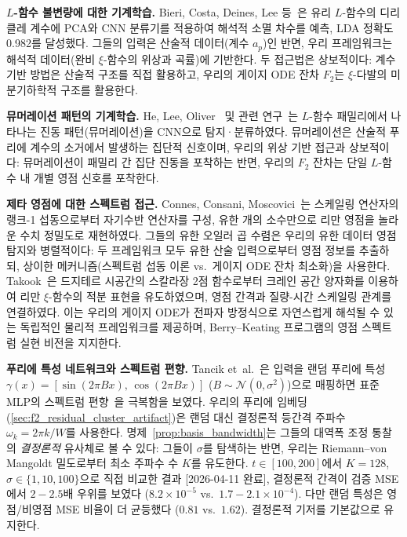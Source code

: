 \documentclass[11pt, a4paper]{article}
\theoremstyle{definition}
\theoremstyle{plain}
\begin{document}
\smallskip\noindent\textbf{$L$-함수 불변량에 대한 기계학습.}
Bieri, Costa, Deines, Lee 등~\cite{Bieri2025MLvanishing}은 유리
$L$-함수의 디리클레 계수에 PCA와 CNN 분류기를 적용하여 해석적 소멸 차수를
예측, LDA 정확도 0.982를 달성했다.
그들의 입력은 산술적 데이터(계수 $a_p$)인 반면, 우리 프레임워크는 해석적
데이터(완비 $\xi$-함수의 위상과 곡률)에 기반한다.
두 접근법은 상보적이다: 계수 기반 방법은 산술적 구조를 직접 활용하고,
우리의 게이지 ODE 잔차 $F_2$는 $\xi$-다발의 미분기하학적 구조를 활용한다.

\smallskip\noindent\textbf{뮤머레이션 패턴의 기계학습.}
He, Lee, Oliver~\cite{He2025Murmurations} 및 관련
연구~\cite{Bober2025MurmurationCNN}는 $L$-함수 패밀리에서 나타나는 진동
패턴(뮤머레이션)을 CNN으로 탐지·분류하였다.
뮤머레이션은 산술적 푸리에 계수의 소거에서 발생하는 집단적 신호이며,
우리의 위상 기반 접근과 상보적이다: 뮤머레이션이 패밀리 간 집단 진동을
포착하는 반면, 우리의 $F_2$ 잔차는 단일 $L$-함수 내 개별 영점 신호를 포착한다.

\smallskip\noindent\textbf{제타 영점에 대한 스펙트럼 접근.}
Connes, Consani, Moscovici~\cite{Connes2025SpectralTriples}는 스케일링
연산자의 랭크-1 섭동으로부터 자기수반 연산자를 구성, 유한 개의 소수만으로
리만 영점을 놀라운 수치 정밀도로 재현하였다.
그들의 유한 오일러 곱 수렴은 우리의 유한 데이터 영점 탐지와 병렬적이다:
두 프레임워크 모두 유한 산술 입력으로부터 영점 정보를 추출하되,
상이한 메커니즘(스펙트럼 섭동 이론 vs.\ 게이지 ODE 잔차 최소화)을 사용한다.
Takook~\cite{Takook2026KreinXi}은 드지테르 시공간의 스칼라장 2점 함수로부터
크레인 공간 양자화를 이용하여 리만 $\xi$-함수의 적분 표현을 유도하였으며,
영점 간격과 질량-시간 스케일링 관계를 연결하였다.
이는 우리의 게이지 ODE가 전파자 방정식으로 자연스럽게 해석될 수 있는
독립적인 물리적 프레임워크를 제공하며, Berry--Keating 프로그램의 영점
스펙트럼 실현 비전을 지지한다.

\smallskip\noindent\textbf{푸리에 특성 네트워크와 스펙트럼 편향.}
Tancik et~al.~\cite{Tancik2020FourierFeatures}은 입력을 랜덤 푸리에 특성
$\gamma(x) = [\sin(2\pi Bx),\,\cos(2\pi Bx)]$
($B\sim\mathcal{N}(0,\sigma^2)$)으로 매핑하면 표준 MLP의 스펙트럼
편향~\cite{Rahaman2019SpectralBias}을 극복함을 보였다.
우리의 푸리에 임베딩 (\cref{sec:f2_residual_cluster_artifact})은 랜덤 대신
결정론적 등간격 주파수 $\omega_k = 2\pi k/W$를 사용한다.
명제~\ref{prop:basis_bandwidth}는 그들의 대역폭 조정 통찰의
\emph{결정론적} 유사체로 볼 수 있다: 그들이 $\sigma$를 탐색하는 반면,
우리는 Riemann--von Mangoldt 밀도로부터 최소 주파수 수 $K$를 유도한다.
$t\in[100,200]$에서 $K=128$, $\sigma\in\{1,10,100\}$으로 직접 비교한 결과
[2026-04-11 완료], 결정론적 간격이
검증 MSE에서 $2{-}2.5$배 우위를 보였다
($8.2\times10^{-5}$ vs.\ $1.7{-}2.1\times10^{-4}$).
다만 랜덤 특성은 영점/비영점 MSE 비율이 더 균등했다
($0.81$ vs.\ $1.62$). 결정론적 기저를 기본값으로 유지한다.
\end{document}
